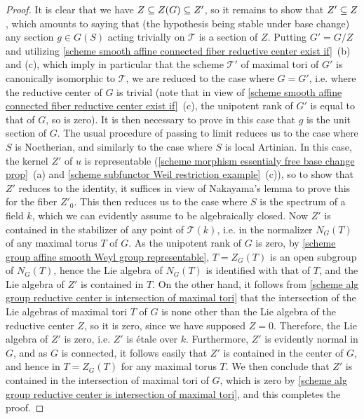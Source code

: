 \begin{proof}
It is clear that we have $Z\subseteq Z(G)\subseteq Z'$, so it remains to show that $Z'\subseteq Z$, which amounts to saying that (the hypothesis being stable under base change) any section $g\in G(S)$ acting trivially on $\mathscr{T}$ is a section of $Z$. Putting $G'=G/Z$ and utilizing \cref{scheme smooth affine connected fiber reductive center exist if}~(b) and (c), which imply in particular that the scheme $\mathscr{T}'$ of maximal tori of $G'$ is canonically isomorphic to $\mathscr{T}$, we are reduced to the case where $G=G'$, i.e. where the reductive center of $G$ is trivial (note that in view of \cref{scheme smooth affine connected fiber reductive center exist if}~(c), the unipotent rank of $G'$ is equal to that of $G$, so is zero). It is then necessary to prove in this case that $g$ is the unit section of $G$. The usual procedure of passing to limit reduces us to the case where $S$ is Noetherian, and similarly to the case where $S$ is local Artinian. In this case, the kernel $Z'$ of $u$ is representable (\cref{scheme morphism essentialy free base change prop}~(a) and \cref{scheme subfunctor Weil restriction example}~(c)), so to show that $Z'$ reduces to the identity, it suffices in view of Nakayama's lemma to prove this for the fiber $Z'_0$. This then reduces us to the case where $S$ is the spectrum of a field $k$, which we can evidently assume to be algebraically closed. Now $Z'$ is contained in the stabilizer of any point of $\mathscr{T}(k)$, i.e. in the normalizer $N_G(T)$ of any maximal torus $T$ of $G$. As the unipotent rank of $G$ is zero, by \cref{scheme group affine smooth Weyl group representable}, $T=Z_G(T)$ is an open subgroup of $N_G(T)$, hence the Lie algebra of $N_G(T)$ is identified with that of $T$, and the Lie algebra of $Z'$ is contained in $T$. On the other hand, it follows from \cref{scheme alg group reductive center is intersection of maximal tori} that the intersection of the Lie algebras of maximal tori $T$ of $G$ is none other than the Lie algebra of the reductive center $Z$, so it is zero, since we have supposed $Z=0$. Therefore, the Lie algebra of $Z'$ is zero, i.e. $Z'$ is \'etale over $k$. Furthermore, $Z'$ is evidently normal in $G$, and as $G$ is connected, it follows easily that $Z'$ is contained in the center of $G$, and hence in $T=Z_G(T)$ for any maximal torus $T$. We then conclude that $Z'$ is contained in the intersection of maximal tori of $G$, which is zero by \cref{scheme alg group reductive center is intersection of maximal tori}, and this completes the proof.
\end{proof}

